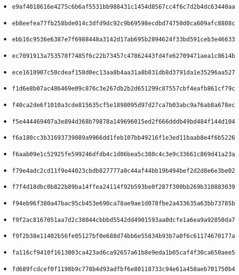 {\begin{itemize}
    \item \texttt{e9af4018616e4275c6b6af5531bb988431c1454d8567cc4f6c7d2b4dc63440aa}
    \item \texttt{eb8eefea77fb258bde014c3dfd9dc92c9b69598ecdbd74750d0ca609afc8808c}
    \item \texttt{ebb16c9536e6387e7f6988448a3142d17ab695b2894624f33bd591ceb3e46633}
    \item \texttt{ec7091913a753578f7485f6c22b73457c47862443fd4fe62709471aea1c8614b}
    \item \texttt{ece1610907c50cdeaf158d0ec13aa8b4aa31a8b831db8d3791da1e35296aa527}
    \item \texttt{f1d6e8b07ac486469e09c876c3e267db2b2d651299c87557cbf4eafb861cf79c}
    \item \texttt{f40ca2de6f1010a3cde815635cf5e1898095d97d27ca7b03abc9a76ab8a678ec}
    \item \texttt{f5e444469407a3e894d368b79878a149696015ed2f666dddb49bd484f144d104}
    \item \texttt{f6a180cc3b31693739089a9966dd1feb107bb49216f1e3ed11baab8e4f6b5226}
    \item \texttt{f6aab09e1c52925fe599246dfdb4c1d06bea5c380c4c3e9c33661c869d41a23a}
    \item \texttt{f79e4adc2cd11f9e44023cbdb827777a0c44af44bb19b494bef2d2d8e6e3be02}
    \item \texttt{f7f4d18dbc0b822b89ba14ffea24114f92b593be0f287f300bb269b310883039}
    \item \texttt{f94eb96f380a47bac95cb453e690ca78ae9ae1d078fbe2a433635a63bb73785b}
    \item \texttt{f9f2ac8167051aa7d2c38044cbbbd5542dd4901593aa0dcfe1a6ea9a92850da7}
    \item \texttt{f9f2b38e11402b56fe05127bf0e688d74bb6e55834b93b7a0f6c61174670177a}
    \item \texttt{fa116cf9410f1613003ca423ad6ca92657a61b8e9eda1b05caf4f30ca650aee5}
    \item \texttt{fd689fcdcef0f1198b9c778b4d93adfbf6e80118733c94e61a450aeb701750b4}
\end{itemize}
}
